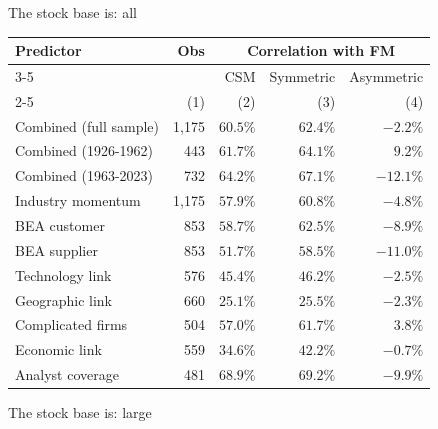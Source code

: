 \documentclass[
]{article}
\author{}
\date{\vspace{-2.5em}}
\begin{document}
The stock base is: all

\begin{tabular}{lrrrr}
  \toprule \multirow{2}{*}{Predictor} & \multirow{2}{*}{Obs} & \multicolumn{3}{c}{Correlation with FM} \\
 \cmidrule(l){3-5} & & CSM & Symmetric & Asymmetric \\
 \cmidrule(l){2-5} \vspace{5pt}  & (1) & (2) & (3) & (4) \\ 
  Combined (full sample) & 1,175 & $60.5\%$ & $62.4\%$ & $-2.2\%$ \\ 
  Combined (1926-1962) & 443 & $61.7\%$ & $64.1\%$ & $9.2\%$ \\ 
   \vspace{5pt}Combined (1963-2023) & 732 & $64.2\%$ & $67.1\%$ & $-12.1\%$ \\ 
  Industry momentum & 1,175 & $57.9\%$ & $60.8\%$ & $-4.8\%$ \\ 
  BEA customer & 853 & $58.7\%$ & $62.5\%$ & $-8.9\%$ \\ 
  BEA supplier & 853 & $51.7\%$ & $58.5\%$ & $-11.0\%$ \\ 
  Technology link & 576 & $45.4\%$ & $46.2\%$ & $-2.5\%$ \\ 
  Geographic link & 660 & $25.1\%$ & $25.5\%$ & $-2.3\%$ \\ 
  Complicated firms & 504 & $57.0\%$ & $61.7\%$ & $3.8\%$ \\ 
  Economic link & 559 & $34.6\%$ & $42.2\%$ & $-0.7\%$ \\ 
  Analyst coverage & 481 & $68.9\%$ & $69.2\%$ & $-9.9\%$ \\ 
   \bottomrule\end{tabular}

The stock base is: large
\end{document}
